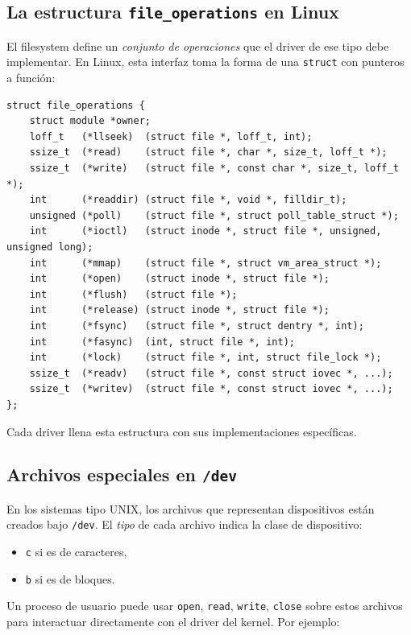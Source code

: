\documentclass[11pt,a4paper]{article}
\begin{document}
\subsection{La estructura \texttt{file\_operations} en Linux}

El filesystem define un \emph{conjunto de operaciones} que el driver de
ese tipo debe implementar. En Linux, esta interfaz toma la forma de
una \texttt{struct} con punteros a función:

\begin{lstlisting}[style=cstyle]
struct file_operations {
    struct module *owner;
    loff_t   (*llseek)  (struct file *, loff_t, int);
    ssize_t  (*read)    (struct file *, char *, size_t, loff_t *);
    ssize_t  (*write)   (struct file *, const char *, size_t, loff_t *);
    int      (*readdir) (struct file *, void *, filldir_t);
    unsigned (*poll)    (struct file *, struct poll_table_struct *);
    int      (*ioctl)   (struct inode *, struct file *, unsigned, unsigned long);
    int      (*mmap)    (struct file *, struct vm_area_struct *);
    int      (*open)    (struct inode *, struct file *);
    int      (*flush)   (struct file *);
    int      (*release) (struct inode *, struct file *);
    int      (*fsync)   (struct file *, struct dentry *, int);
    int      (*fasync)  (int, struct file *, int);
    int      (*lock)    (struct file *, int, struct file_lock *);
    ssize_t  (*readv)   (struct file *, const struct iovec *, ...);
    ssize_t  (*writev)  (struct file *, const struct iovec *, ...);
};
\end{lstlisting}

Cada driver llena esta estructura con sus implementaciones específicas.

\subsection{Archivos especiales en \texttt{/dev}}

En los sistemas tipo UNIX, los archivos que representan dispositivos
están creados bajo \texttt{/dev}. El \emph{tipo} de cada archivo
indica la clase de dispositivo:

\begin{itemize}[leftmargin=*,nosep]
    \item \texttt{c} si es de caracteres,
    \item \texttt{b} si es de bloques.
\end{itemize}

Un proceso de usuario puede usar \texttt{open}, \texttt{read},
\texttt{write}, \texttt{close} sobre estos archivos para interactuar
directamente con el driver del kernel. Por ejemplo:
\end{document}
